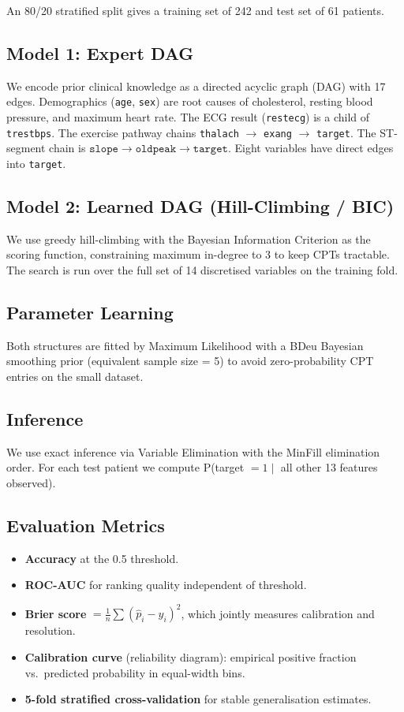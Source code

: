 \documentclass[10pt,twocolumn]{article}
\begin{document}
An 80/20 stratified split gives a training set of 242 and test set of 61 patients.

\subsection{Model 1: Expert DAG}
We encode prior clinical knowledge as a directed acyclic graph (DAG) with 17
edges. Demographics (\texttt{age}, \texttt{sex}) are root causes of
cholesterol, resting blood pressure, and maximum heart rate. The ECG result
(\texttt{restecg}) is a child of \texttt{trestbps}. The exercise pathway chains
\texttt{thalach} $\to$ \texttt{exang} $\to$ \texttt{target}. The ST-segment chain
is $\texttt{slope} \to \texttt{oldpeak} \to \texttt{target}$. Eight variables
have direct edges into \texttt{target}.

\subsection{Model 2: Learned DAG (Hill-Climbing / BIC)}
We use greedy hill-climbing \cite{pgmpy} with the Bayesian Information
Criterion as the scoring function, constraining maximum in-degree to 3 to keep
CPTs tractable. The search is run over the full set of 14 discretised variables
on the training fold.

\subsection{Parameter Learning}
Both structures are fitted by Maximum Likelihood with a BDeu Bayesian smoothing
prior (equivalent sample size = 5) to avoid zero-probability CPT entries on the
small dataset.

\subsection{Inference}
We use exact inference via Variable Elimination with the MinFill elimination
order. For each test patient we compute P(target $= 1 \mid$ all other 13
features observed).

\subsection{Evaluation Metrics}
\begin{itemize}\setlength{\itemsep}{0pt}
  \item \textbf{Accuracy} at the 0.5 threshold.
  \item \textbf{ROC-AUC} for ranking quality independent of threshold.
  \item \textbf{Brier score} $= \frac{1}{n}\sum(\hat{p}_i - y_i)^2$,
        which jointly measures calibration and resolution.
  \item \textbf{Calibration curve} (reliability diagram): empirical positive
        fraction vs.\ predicted probability in equal-width bins.
  \item \textbf{5-fold stratified cross-validation} for stable generalisation
        estimates.
\end{itemize}
\end{document}
